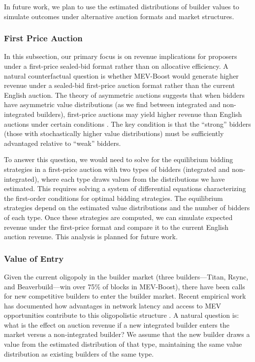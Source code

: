 \documentclass[12pt,reqno]{amsart}
\begin{document}
In future work, we plan to use the estimated distributions of builder values to simulate outcomes under alternative auction formats and market structures.

\subsubsection{First Price Auction}
In this subsection, our primary focus is on revenue implications for proposers under a first-price sealed-bid format rather than on allocative efficiency.
A natural counterfactual question is whether MEV-Boost would generate higher revenue under a sealed-bid first-price auction format rather than the current English auction. The theory of asymmetric auctions suggests that when bidders have asymmetric value distributions (as we find between integrated and non-integrated builders), first-price auctions may yield higher revenue than English auctions under certain conditions \citep{10.1111/1467-937X.00137, kirkegaard2012mechanism}. The key condition is that the ``strong'' bidders (those with stochastically higher value distributions) must be sufficiently advantaged relative to ``weak'' bidders. 

To answer this question, we would need to solve for the equilibrium bidding strategies in a first-price auction with two types of bidders (integrated and non-integrated), where each type draws values from the distributions we have estimated. This requires solving a system of differential equations characterizing the first-order conditions for optimal bidding strategies. The equilibrium strategies depend on the estimated value distributions and the number of bidders of each type. Once these strategies are computed, we can simulate expected revenue under the first-price format and compare it to the current English auction revenue. This analysis is planned for future work. 

\subsubsection{Value of Entry}
Given the current oligopoly in the builder market (three builders---Titan, Rsync, and Beaverbuild---win over 75\% of blocks in MEV-Boost), there have been calls for new competitive builders to enter the builder market. Recent empirical work has documented how advantages in network latency and access to MEV opportunities contribute to this oligopolistic structure \citep{wu2024centralization}. A natural question is: what is the effect on auction revenue if a new integrated builder enters the market versus a non-integrated builder? We assume that the new builder draws a value from the estimated distribution of that type, maintaining the same value distribution as existing builders of the same type.
\end{document}
